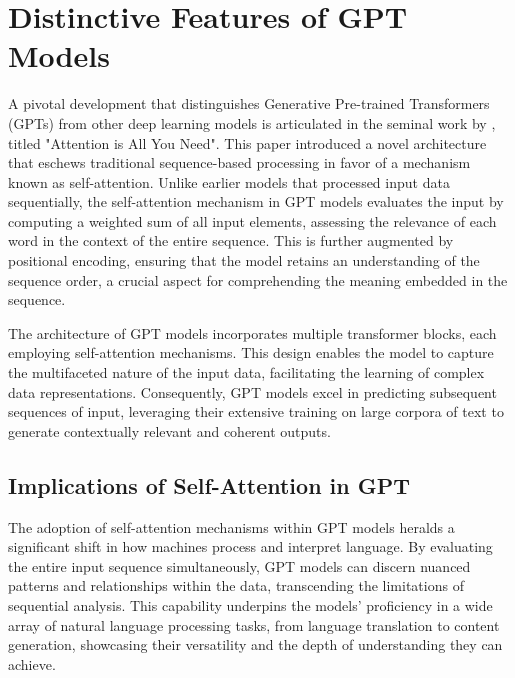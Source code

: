 \documentclass{article}
\begin{document}
\section{Distinctive Features of GPT Models}

A pivotal development that distinguishes Generative Pre-trained Transformers (GPTs) from other deep learning models is articulated in the seminal work by \citet{vaswani2017attention}, titled "Attention is All You Need". This paper introduced a novel architecture that eschews traditional sequence-based processing in favor of a mechanism known as self-attention. Unlike earlier models that processed input data sequentially, the self-attention mechanism in GPT models evaluates the input by computing a weighted sum of all input elements, assessing the relevance of each word in the context of the entire sequence. This is further augmented by positional encoding, ensuring that the model retains an understanding of the sequence order, a crucial aspect for comprehending the meaning embedded in the sequence.

The architecture of GPT models incorporates multiple transformer blocks, each employing self-attention mechanisms. This design enables the model to capture the multifaceted nature of the input data, facilitating the learning of complex data representations. Consequently, GPT models excel in predicting subsequent sequences of input, leveraging their extensive training on large corpora of text to generate contextually relevant and coherent outputs.

\subsection{Implications of Self-Attention in GPT}

The adoption of self-attention mechanisms within GPT models heralds a significant shift in how machines process and interpret language. By evaluating the entire input sequence simultaneously, GPT models can discern nuanced patterns and relationships within the data, transcending the limitations of sequential analysis. This capability underpins the models' proficiency in a wide array of natural language processing tasks, from language translation to content generation, showcasing their versatility and the depth of understanding they can achieve.



\end{document}
